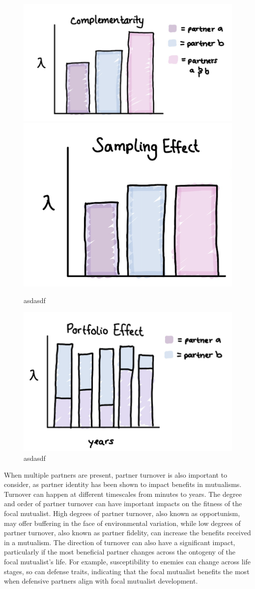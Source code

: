 \documentclass[12pt,a4paper]{article}
\begin{document}
\begin{figure}[h]
	\includegraphics[width=0.58\linewidth]{complementarity.png}
	\includegraphics[width=0.40\linewidth]{sampling_effect.png}
	\caption{asdasdf}
	\label{fig:comp-samp}
\end{figure}
\begin{figure}[h]
	\includegraphics[width=0.60\linewidth]{portfolio_effect.png}
	\caption{asdasdf}
	\label{fig:portfolio}
\end{figure}


When multiple partners are present, partner turnover is also important to consider, as partner identity has been shown to impact benefits in mutualisms\cite{Djieto-Lordon2005, Ness2006, Bruna2014}. 
Turnover can happen at different timescales\cite{Oliveira1999,Horvitz1986} from minutes to years. 
The degree and order of partner turnover can have important impacts on the fitness of the focal mutualist.
High degrees of partner turnover, also known as opportunism, may offer buffering in the face of environmental variation\cite{Hegland2009}, while low degrees of partner turnover, also known as partner fidelity, can increase the benefits received in a mutualism\cite{Sachs2004}.
The direction of turnover can also have a significant impact, particularly if the most beneficial partner changes across the ontogeny of the focal mutualist's life\cite{Fonseca2003}.
For example, susceptibility to enemies can change across life stages\cite{Boege2005,Barton2010}, so can defense traits, indicating that the focal mutualist benefits the most when defensive partners align with focal mutualist development\cite{Djieto-Lordon2005}. 
\end{document}
